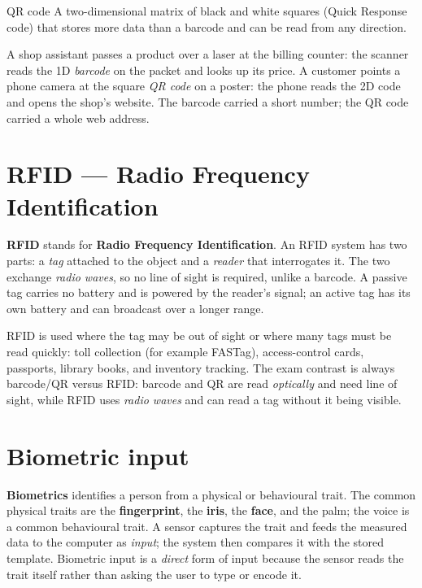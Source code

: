 \begin{definitionbox}{QR code}
A two-dimensional matrix of black and white squares (Quick Response code)
that stores more data than a barcode and can be read from any direction.
\end{definitionbox}

\begin{example}
A shop assistant passes a product over a laser at the billing counter: the
scanner reads the 1D \emph{barcode} on the packet and looks up its price. A
customer points a phone camera at the square \emph{QR code} on a poster: the
phone reads the 2D code and opens the shop's website. The barcode carried a
short number; the QR code carried a whole web address.
\end{example}

\section{RFID --- Radio Frequency Identification}
\textbf{RFID} stands for \textbf{Radio Frequency Identification}. An RFID
system has two parts: a \emph{tag} attached to the object and a \emph{reader}
that interrogates it. The two exchange \emph{radio waves}, so no line of
sight is required, unlike a barcode. A passive tag carries no battery and is
powered by the reader's signal; an active tag has its own battery and can
broadcast over a longer range.

RFID is used where the tag may be out of sight or where many tags must be
read quickly: toll collection (for example FASTag), access-control cards,
passports, library books, and inventory tracking. The exam contrast is
always barcode/QR versus RFID: barcode and QR are read \emph{optically} and
need line of sight, while RFID uses \emph{radio waves} and can read a tag
without it being visible.

\section{Biometric input}
\textbf{Biometrics} identifies a person from a physical or behavioural
trait. The common physical traits are the \textbf{fingerprint}, the
\textbf{iris}, the \textbf{face}, and the palm; the voice is a common
behavioural trait. A sensor captures the trait and feeds the measured data to
the computer as \emph{input}; the system then compares it with the stored
template. Biometric input is a \emph{direct} form of input because the sensor
reads the trait itself rather than asking the user to type or encode it.

